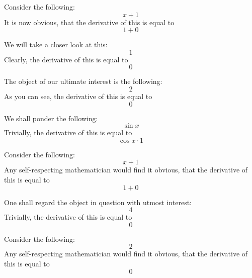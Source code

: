 \documentclass{article}
\begin{document}
Consider the following:
\begin{equation}
x + 1 
\end{equation}
It is now obvious, that the derivative of this is equal to
\begin{equation}
1 + 0 
\end{equation}

We will take a closer look at this:
\begin{equation}
1 
\end{equation}
Clearly, the derivative of this is equal to
\begin{equation}
0 
\end{equation}

The object of our ultimate interest is the following:
\begin{equation}
2 
\end{equation}
As you can see, the derivative of this is equal to
\begin{equation}
0 
\end{equation}

We shall ponder the following:
\begin{equation}
\sin x 
\end{equation}
Trivially, the derivative of this is equal to
\begin{equation}
\cos x \cdot 1 
\end{equation}

Consider the following:
\begin{equation}
x + 1 
\end{equation}
Any self-respecting mathematician would find it obvious, that the derivative of this is equal to
\begin{equation}
1 + 0 
\end{equation}

One shall regard the object in question with utmost interest:
\begin{equation}
4 
\end{equation}
Trivially, the derivative of this is equal to
\begin{equation}
0 
\end{equation}

Consider the following:
\begin{equation}
2 
\end{equation}
Any self-respecting mathematician would find it obvious, that the derivative of this is equal to
\begin{equation}
0 
\end{equation}
\end{document}
